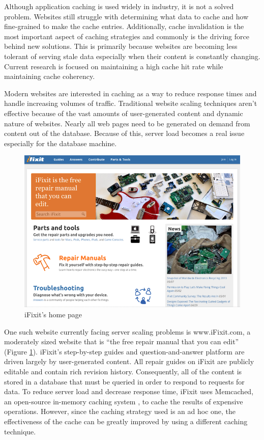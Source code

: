 \documentclass[12pt]{ucthesis}
\begin{document}
Although application caching is used widely in industry, it is not a solved problem.
Websites still struggle with determining what data to cache and how fine-grained to make the cache entries.
Additionally, cache invalidation is the most important aspect of caching strategies and commonly is the driving force behind new solutions.
This is primarily because websites are becoming less tolerant of serving stale data especially when their content is constantly changing.
Current research is focused on maintaining a high cache hit rate while maintaining cache coherency.

Modern websites are interested in caching as a way to reduce response times and handle increasing volumes of traffic.
Traditional website scaling techniques aren't effective because of the vast amounts of user-generated content and dynamic nature of websites.
Nearly all web pages need to be generated on demand from content out of the database.
Because of this, server load becomes a real issue especially for the database machine.

\begin{figure}[h]
\centering
\includegraphics[width=\textwidth]{assets/iFixitHomepage.png}
\caption{iFixit's home page}
\label{fig:iFixitHomePage}
\end{figure}

One such website currently facing server scaling problems is \textsf{www.iFixit.com}, a moderately sized website that is ``the free repair manual that you can edit''\cite{ifixitDotCom} (Figure \ref{fig:iFixitHomePage}).
\textsf{iFixit}'s step-by-step guides and question-and-answer platform are driven largely by user-generated content.
All repair guides on \textsf{iFixit} are publicly editable and contain rich revision history.
Consequently, all of the content is stored in a database that must be queried in order to respond to requests for data.
To reduce server load and decrease response time, \textsf{iFixit} uses \textsf{Memcached}, an open-source in-memory caching system \cite{memcachedDotOrg}, to cache the results of expensive operations.
However, since the caching strategy used is an ad hoc one, the effectiveness of the cache can be greatly improved by using a different caching technique.
\end{document}

